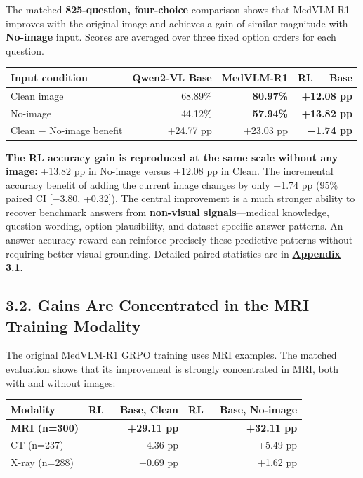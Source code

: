 \documentclass[
  10pt,
  a4paper,
]{article}
\newcounter{none} %
\begin{document}
The matched \textbf{825-question, four-choice} comparison shows that
MedVLM-R1 improves with the original image and achieves a gain of
similar magnitude with \textbf{No-image} input. Scores are averaged over
three fixed option orders for each question.

{\def\LTcaptype{none} %
\begin{longtable}[]{@{}lrrr@{}}
\toprule\noalign{}
Input condition & Qwen2-VL Base & MedVLM-R1 & RL − Base \\
\midrule\noalign{}
\endhead
\bottomrule\noalign{}
\endlastfoot
Clean image & 68.89\% & \textbf{80.97\%} & \textbf{+12.08 pp} \\
No-image & 44.12\% & \textbf{57.94\%} & \textbf{+13.82 pp} \\
Clean − No-image benefit & +24.77 pp & +23.03 pp & \textbf{−1.74 pp} \\
\end{longtable}
}

\textbf{The RL accuracy gain is reproduced at the same scale without any
image:} +13.82 pp in No-image versus +12.08 pp in Clean. The incremental
accuracy benefit of adding the current image changes by only −1.74 pp
(95\% paired CI {[}−3.80, +0.32{]}). The central improvement is a much
stronger ability to recover benchmark answers from \textbf{non-visual
signals}---medical knowledge, question wording, option plausibility, and
dataset-specific answer patterns. An answer-accuracy reward can
reinforce precisely these predictive patterns without requiring better
visual grounding. Detailed paired statistics are in
\textbf{\hyperref[matched-scoring-clean-versus-no-image]{Appendix 3.1}}.

\subsection{3.2. Gains Are Concentrated in the MRI Training
Modality}\label{gains-are-concentrated-in-the-mri-training-modality}

The original MedVLM-R1 GRPO training uses MRI examples. The matched
evaluation shows that its improvement is strongly concentrated in MRI,
both with and without images:

{\def\LTcaptype{none} %
\begin{longtable}[]{@{}lrr@{}}
\toprule\noalign{}
Modality & RL − Base, Clean & RL − Base, No-image \\
\midrule\noalign{}
\endhead
\bottomrule\noalign{}
\endlastfoot
\textbf{MRI (n=300)} & \textbf{+29.11 pp} & \textbf{+32.11 pp} \\
CT (n=237) & +4.36 pp & +5.49 pp \\
X-ray (n=288) & +0.69 pp & +1.62 pp \\
\end{longtable}
}
\end{document}
